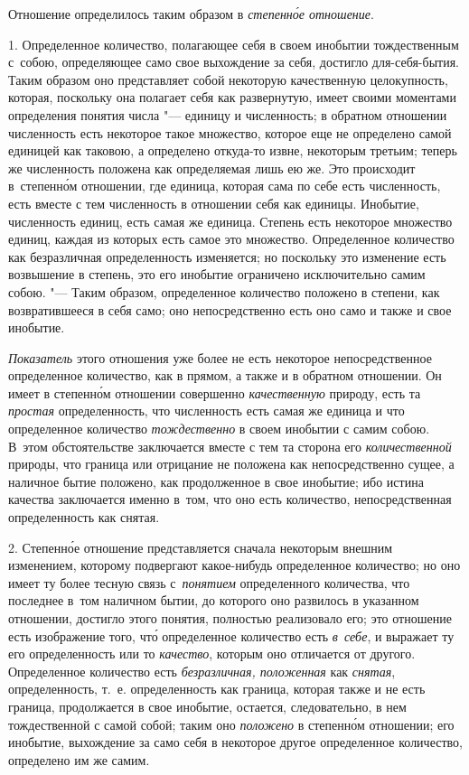 Отношение определилось таким образом в {\em степенн\'{о}е отношение}.


1. Определенное количество, полагающее себя в своем инобытии тождественным
с~собою, определяющее само свое выхождение за себя, достигло для-себя-бытия.
Таким образом оно представляет собой некоторую качественную целокупность,
которая, поскольку она полагает себя как развернутую, имеет своими моментами
определения понятия числа "--- единицу и численность; в обратном отношении
численность есть некоторое такое множество, которое еще не определено самой
единицей как таковою, а определено откуда-то извне, некоторым третьим; теперь
же численность положена как определяемая лишь ею же. Это происходит
в~степенн\'{о}м отношении, где единица, которая сама по себе есть численность,
есть вместе с тем численность в отношении себя как единицы. Инобытие,
численность единиц, есть самая же единица. Степень есть некоторое множество
единиц, каждая из которых есть самое это множество. Определенное количество как
безразличная определенность изменяется; но поскольку это изменение есть
возвышение в степень, это его инобытие ограничено исключительно самим собою.
"--- Таким образом, определенное количество положено в степени, как
возвратившееся в себя само; оно непосредственно есть оно само и также
и свое инобытие.

{\em Показатель} этого отношения уже более не есть некоторое непосредственное
определенное количество, как в прямом, а также и в обратном отношении. Он имеет
в степенн\'{о}м отношении совершенно {\em качественную} природу, есть та
{\em простая} определенность, что численность есть самая же единица и что
определенное количество {\em тождественно} в своем инобытии с самим собою.
В~этом обстоятельстве заключается вместе с тем та сторона его
{\em количественной} природы, что граница или отрицание не положена как
непосредственно сущее, а наличное бытие положено, как продолженное в свое
инобытие; ибо истина качества заключается именно в~том, что оно есть
количество, непосредственная определенность как снятая.

2. Степенн\'{о}е отношение представляется сначала некоторым внешним изменением,
которому подвергают какое-нибудь определенное количество; но оно имеет ту более
тесную связь с~{\em понятием} определенного количества, что последнее в~том
наличном бытии, до которого оно развилось в указанном отношении, достигло этого
понятия, полностью реализовало его; это отношение есть изображение того,
чт\'{о} определенное количество есть {\em в~себе}, и выражает ту его
определенность или то {\em качество}, которым оно отличается от другого.
Определенное количество есть {\em безразличная, положенная} как {\em снятая},
определенность, т.~е. определенность как граница, которая также и не есть
граница, продолжается в свое инобытие, остается, следовательно, в нем
тождественной с самой собой; таким оно {\em положено} в степенн\'{о}м
отношении; его инобытие, выхождение за само себя в некоторое другое
определенное количество, определено им же самим.


